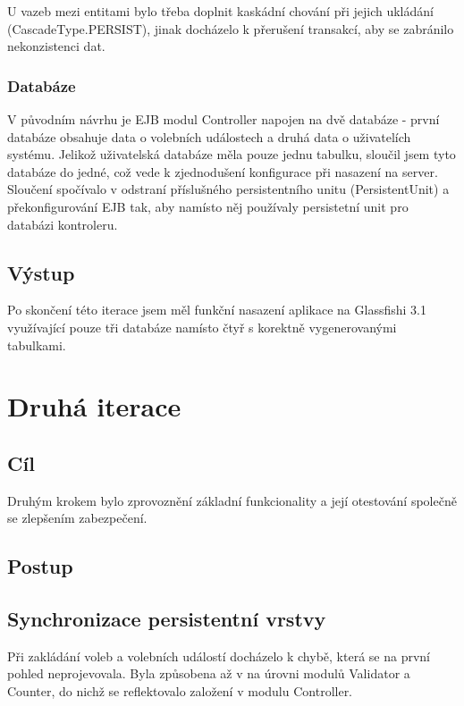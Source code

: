 \documentclass[11pt,twoside,a4paper]{book}
\begin{document}
U vazeb mezi entitami bylo třeba doplnit kaskádní chování při jejich ukládání (CascadeType.PERSIST), jinak docházelo k přerušení transakcí, aby se zabránilo nekonzistenci dat.

\subsubsection{Databáze}

V původním návrhu je EJB modul Controller napojen na dvě databáze - první databáze obsahuje data o volebních událostech a druhá data o uživatelích systému. Jelikož uživatelská databáze měla pouze jednu tabulku, sloučil jsem tyto databáze do jedné, což vede k zjednodušení konfigurace při nasazení na server. Sloučení spočívalo v odstraní příslušného persistentního unitu (PersistentUnit) a překonfigurování EJB tak, aby namísto něj používaly persistetní unit pro databázi kontroleru.

\subsection{Výstup}

Po skončení této iterace jsem měl funkční nasazení aplikace na Glassfishi 3.1 využívající pouze tři databáze namísto čtyř s korektně vygenerovanými tabulkami.


\section{Druhá iterace}

\subsection{Cíl}

Druhým krokem bylo zprovoznění základní funkcionality a její otestování společně se zlepšením zabezpečení.

\subsection{Postup}

\subsection{Synchronizace persistentní vrstvy}

Při zakládání voleb a volebních událostí docházelo k chybě, která se na první pohled neprojevovala. Byla způsobena až v na úrovni modulů Validator a Counter, do nichž se reflektovalo založení v modulu Controller. 
\end{document}
